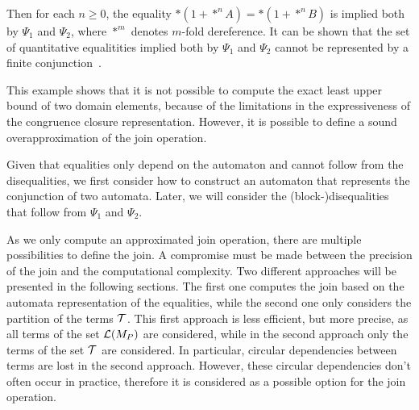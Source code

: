 \begin{example}
\begin{center}
\begin{minipage}{0.65\textwidth}
        \end{minipage}
    \end{center}

    Then for each $n \geq 0$, the equality $*(1+*^n A) = *(1 + *^n B)$ is implied both by $\Psi_1$ and $\Psi_2$, where $*^m$ denotes $m$-fold dereference.
    It can be shown that the set of quantitative equalitities implied both by $\Psi_1$ and $\Psi_2$ cannot be represented by a finite conjunction~\cite{join, 2pointer}.
\end{example}

This example shows that it is not possible to compute the exact least upper bound of two domain elements,
because of the limitations in the expressiveness of the congruence closure representation.
However, it is possible to define a sound overapproximation of the join operation.

Given that equalities only depend on the automaton and cannot follow from the disequalities, we first consider how to construct an automaton that represents the conjunction of two automata.
Later, we will consider the (block-)disequalities that follow from $\Psi_1$ and $\Psi_2$.

As we only compute an approximated join operation, there are multiple possibilities to define the join.
A compromise must be made between the precision of the join and the computational complexity.
Two different approaches will be presented in the following sections.
The first one computes the join based on the automata representation of the equalities,
while the second one only considers the partition of the terms $\mathcal{T}$.
This first approach is less efficient, but more precise,
as all terms of the set $\mathcal{L}(M_P)$ are considered, while in the second approach only the terms of the set $\mathcal{T}$ are considered.
In particular, circular dependencies between terms are lost in the second approach.
However, these circular dependencies don't often occur in practice, therefore it is
considered as a possible option for the join operation.

